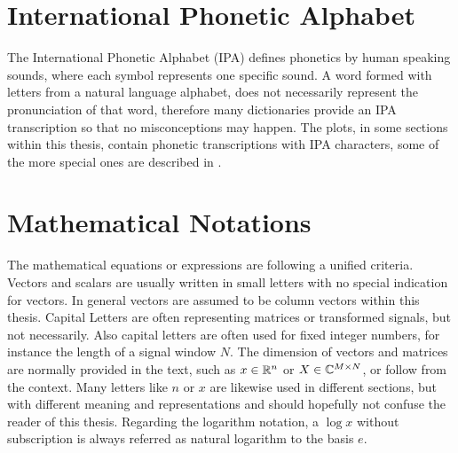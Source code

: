 
\section{International Phonetic Alphabet}\label{sec:intro_overview_ipa}
The International Phonetic Alphabet (IPA) defines phonetics by human speaking sounds, where each symbol represents one specific sound.
A word formed with letters from a natural language alphabet, does not necessarily represent the pronunciation of that word, therefore many dictionaries provide an IPA transcription so that no misconceptions may happen.
The plots, in some sections within this thesis, contain phonetic transcriptions with IPA characters, some of the more special ones are described in .




\section{Mathematical Notations}\label{sec:intro_overview_math}
The mathematical equations or expressions are following a unified criteria.
Vectors and scalars are usually written in small letters with no special indication for vectors.
In general vectors are assumed to be column vectors within this thesis.
Capital Letters are often representing matrices or transformed signals, but not necessarily.
Also capital letters are often used for fixed integer numbers, for instance the length of a signal window $N$.
The dimension of vectors and matrices are normally provided in the text, such as $x \in \mathbb{R}^n$ or $X \in \mathbb{C}^{M \times N}$, or follow from the context.
Many letters like $n$ or $x$ are likewise used in different sections, but with different meaning and representations and should hopefully not confuse the reader of this thesis.
Regarding the logarithm notation, a $\log x$ without subscription is always referred as natural logarithm to the basis $e$.
